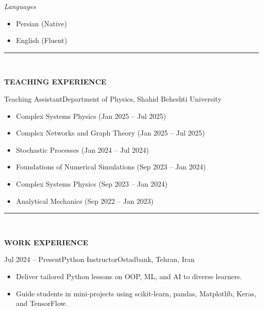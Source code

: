 \documentclass[12pt, b4paper]{cv}
\begin{document}
\textit{Languages}

\begin{multicols}{3}[]
	\begin{itemize}
	\setlength\itemsep{-1pt}
	  \item  Persian (Native)
	  \item  English (Fluent)
	\end{itemize}
\end{multicols}

\vspace{-0.15in}
\rule{\textwidth}{1pt}\\
\vspace{-0.15in}

{\Large \textbf{TEACHING EXPERIENCE}}
\vspace{0.1in}

\begin{work}{}{Teaching Assistant}{Department of Physics, Shahid Beheshti University}
	\vspace{-0.3in}
	\begin{multicols}{2}
		\begin{itemize}
			\item Complex Systems Physics (Jan 2025 – Jul 2025)
			\item Complex Networks and Graph Theory (Jan 2025 – Jul 2025)
			\item Stochastic Processes (Jan 2024 – Jul 2024)
			\item Foundations of Numerical Simulations (Sep 2023 – Jan 2024)
			\item Complex Systems Physics (Sep 2023 – Jan 2024)
			\item Analytical Mechanics (Sep 2022 – Jan 2023)
		\end{itemize}    
	\end{multicols}
\end{work}
\vspace{-0.15in}



\vspace{-0.15in}
\rule{\textwidth}{1pt}\\
\vspace{-0.15in}

{\Large \textbf{WORK EXPERIENCE}}
\vspace{0.1in}

\begin{work}{Jul 2024 -- Present}{Python Instructor}{Ostadbank, Tehran, Iran}
\vspace{-0.1in}
	\begin{itemize}
		\item Deliver tailored Python lessons on OOP, ML, and AI to diverse learners.
		\item Guide students in mini-projects using scikit-learn, pandas, Matplotlib, Keras, and TensorFlow.
	\end{itemize}

\end{work}
\end{document}
